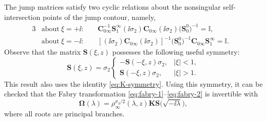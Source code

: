 The jump matrices satisfy two cyclic relations about the nonsingular self-intersection points of the jump contour, namely,
 \begin{alignat*}{3}
 &\text{about}\ \xi = +\ii\colon\ &&\mathbf{C}_{0\infty}^{-1} \mathbf{S}_1^\infty (\ii \sigma_2) \mathbf{C}_{0\infty} (\ii \sigma_2) \big(\mathbf{S}_0^0\big)^{-1} = \mathbb{I}, &\\
 &\text{about}\ \xi = -\ii\colon\ &&\left[(\ii \sigma_2) \mathbf{C}_{0\infty} (\ii \sigma_2)\right]^{-1} \big(\mathbf{S}_{0}^0\big)^{-1}\mathbf{C}_{0\infty}\mathbf S_1^\infty = \mathbb{I}.&
\end{alignat*}
Observe that the matrix ${\mathbf{S}}(\xi, z)$ possesses the following useful symmetry:
\begin{equation}
{\mathbf{S}}(\xi, z) = \sigma_2 \begin{cases}
 -{\mathbf{S}}(-\xi, z) \sigma_2, & |\xi|<1, \\
{\mathbf{S}}(-\xi, z) \sigma_2, & |\xi|>1.
\label{eq:S-symmetry}
\end{cases}
\end{equation}
This result also uses the identity \eqref{eq:K-symmetry}. Using this symmetry, it can be checked that the Fabry transformation \eqref{eq:fabry-1}--\eqref{eq:fabry-2} is invertible with{\samepage
\begin{equation}
\mathbf \Omega(\lambda ) = \rho_\infty^{\sigma_3/2}(\lambda, z) \mathbf{K} \mathbf S\big(\sqrt{-\ii \lambda}\big),
\label{eq:inverse-fabry}
\end{equation}
where all roots are principal branches.}

